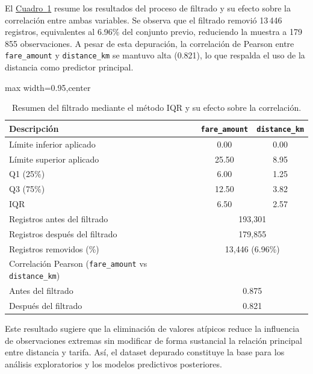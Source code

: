 \documentclass[10pt]{article}
\newcommand{\cuadroref}[1]{\hyperref[#1]{Cuadro~\ref*{#1}}}
\begin{document}
	El \cuadroref{tab:iqr_filtrado} resume los resultados del proceso de filtrado y su efecto sobre la correlación entre ambas variables. Se observa que el filtrado removió 13\,446 registros, equivalentes al 6.96\% del conjunto previo, reduciendo la muestra a 179\,855 observaciones. A pesar de esta depuración, la correlación de Pearson entre \texttt{fare\_amount} y \texttt{distance\_km} se mantuvo alta (0.821), lo que respalda el uso de la distancia como predictor principal.

	\begin{table}[!htbp]
		\centering
		\caption{Resumen del filtrado mediante el método IQR y su efecto sobre la correlación.}
		\label{tab:iqr_filtrado}
		\begin{adjustbox}{max width=0.95\textwidth,center}
			\begin{tabular}{lcc}
				\hline
				\textbf{Descripción} & \texttt{fare\_amount} & \texttt{distance\_km} \\
				\hline
				Límite inferior aplicado & 0.00 & 0.00 \\
				Límite superior aplicado & 25.50 & 8.95 \\
				Q1 (25\%) & 6.00 & 1.25 \\
				Q3 (75\%) & 12.50 & 3.82 \\
				IQR & 6.50 & 2.57 \\
				\hline
				Registros antes del filtrado & \multicolumn{2}{c}{193{,}301} \\
				Registros después del filtrado & \multicolumn{2}{c}{179{,}855} \\
				Registros removidos (\%) & \multicolumn{2}{c}{13{,}446 (6.96\%)} \\
				\hline
				Correlación Pearson (\texttt{fare\_amount} vs \texttt{distance\_km}) & \multicolumn{2}{c}{} \\
				\hspace{1em} Antes del filtrado & \multicolumn{2}{c}{0.875} \\
				\hspace{1em} Después del filtrado & \multicolumn{2}{c}{0.821} \\
				\hline
			\end{tabular}
		\end{adjustbox}
	\end{table}

	Este resultado sugiere que la eliminación de valores atípicos reduce la influencia de observaciones extremas sin modificar de forma sustancial la relación principal entre distancia y tarifa. Así, el dataset depurado constituye la base para los análisis exploratorios y los modelos predictivos posteriores.
\end{document}
